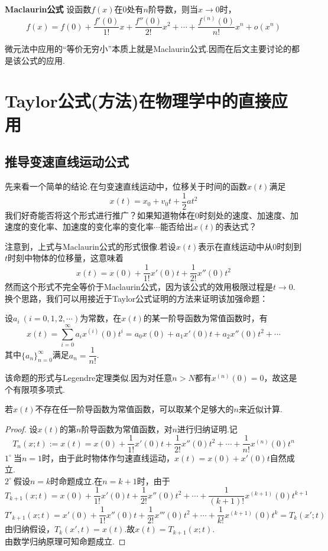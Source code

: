 \begin{corollary}{\textbf{Maclaurin公式}}
	设函数$f(x)$在$0$处有$n$阶导数，则当$x \to 0$时，$$f(x)=f(0)+\frac{f'(0)}{1!}x + \frac{f''(0)}{2!}x^2 + \cdots + \frac{f^{(n)}(0)}{n!}x^n + o(x^n)$$
\end{corollary}

微元法中应用的“等价无穷小”本质上就是Maclaurin公式.因而在后文主要讨论的都是该公式的应用.


\chapter{Taylor公式(方法)在物理学中的直接应用}

\section{推导变速直线运动公式}

先来看一个简单的结论.在匀变速直线运动中，位移关于时间的函数$x(t)$满足$$x(t) = x_0 + v_0t + \frac{1}{2}at^2$$
我们好奇能否将这个形式进行推广？如果知道物体在$0$时刻处的速度、加速度、加速度的变化率、加速度的变化率的变化率$\cdots$能否给出$x(t)$的表达式？

注意到，上式与Maclaurin公式的形式很像.若设$x(t)$表示在直线运动中从$0$时刻到$t$时刻中物体的位移量，这意味着$$x(t) = x(0) + \frac{1}{1!} x'(0)t + \frac{1}{2!} x''(0)t^2$$
然而这个形式不完全等价于Maclaurin公式，因为该公式的效用极限过程是$t \to 0$.换个思路，我们可以用接近于Taylor公式证明的方法来证明该加强命题：

\begin{proposition}{}
	设$a_i~(i=0,1,2,\cdots)$为常数，在$x(t)$的某一阶导函数为常值函数时，有$$x(t) = \sum_{i=0}^{\infty} a_ix^{(i)}(0) t^{i} = a_0x(0) + a_1x'(0)t + a_2x''(0)t^2 + \cdots$$
	其中$\{ a_n \}_{n=0}^{\infty}$满足$a_n = \dfrac{1}{n!}$.
\end{proposition}
\begin{remark}
	该命题的形式与Legendre定理类似.因为对任意$n>N$都有$x^{(n)}(0)=0$，故这是个有限项多项式.
\end{remark}
\begin{remark}
	若$x(t)$不存在任一阶导函数为常值函数，可以取某个足够大的$n$来近似计算.
\end{remark}
\begin{proof}
	设$x(t)$的第$n$阶导函数为常值函数，对$n$进行归纳证明.记$$T_n(x;t) := x(t) = x(0) + \frac{1}{1!} x'(0)t + \frac{1}{2!} x''(0)t^2 + \cdots + \frac{1}{n!} x^{(n)}(0)t^n$$
	$1^{\circ}~$当$n=1$时，由于此时物体作匀速直线运动，$x(t)=x(0)+x'(0)t$自然成立. \\
	$2^{\circ}~$假设$n=k$时命题成立.在$n=k+1$时，由于
	$$T_{k+1}(x;t) = x(0) + \frac{1}{1!} x'(0)t + \frac{1}{2!} x''(0)t^2 + \cdots + \frac{1}{(k+1)!} x^{(k+1)}(0)t^{k+1}$$
	$$T'_{k+1}(x;t) = x'(0) + \frac{1}{1!} x''(0)t + \frac{1}{2!} x'''(0)t^2 + \cdots + \frac{1}{k!} x^{(k+1)}(0)t^k = T_{k}(x';t)$$
	由归纳假设，$T_k(x',t)=x(t)$.故$x(t)=T_{k+1}(x;t)$. \\
	由数学归纳原理可知命题成立.
\end{proof}

